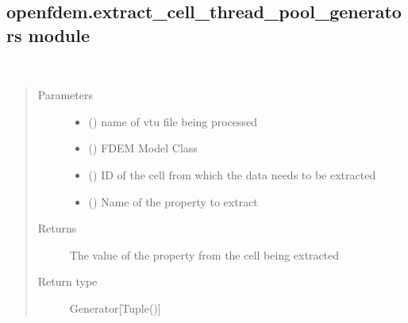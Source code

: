 \documentclass[letterpaper,10pt,english]{sphinxmanual}
\begin{document}
\subsection{openfdem.extract\_cell\_thread\_pool\_generators module}
\label{\detokenize{openfdem:module-openfdem.extract_cell_thread_pool_generators}}\label{\detokenize{openfdem:openfdem-extract-cell-thread-pool-generators-module}}

\begin{fulllineitems}
\label{\detokenize{openfdem:openfdem.extract_cell_thread_pool_generators.history_cellinfo_func}}~\begin{quote}\begin{description}
\item[{Parameters}] \leavevmode\begin{itemize}
\item {} 
 () \textendash{} name of vtu file being processed

\item {} 
 ({\hyperref[\detokenize{openfdem:openfdem.openfdem.Model}]{}}) \textendash{} FDEM Model Class

\item {} 
 () \textendash{} ID of the cell from which the data needs to be extracted

\item {} 
 () \textendash{} Name of the property to extract

\end{itemize}

\item[{Returns}] \leavevmode
The value of the property from the cell being extracted

\item[{Return type}] \leavevmode
Generator{[}Tuple(){]}

\end{description}\end{quote}

\end{fulllineitems}
\end{document}
